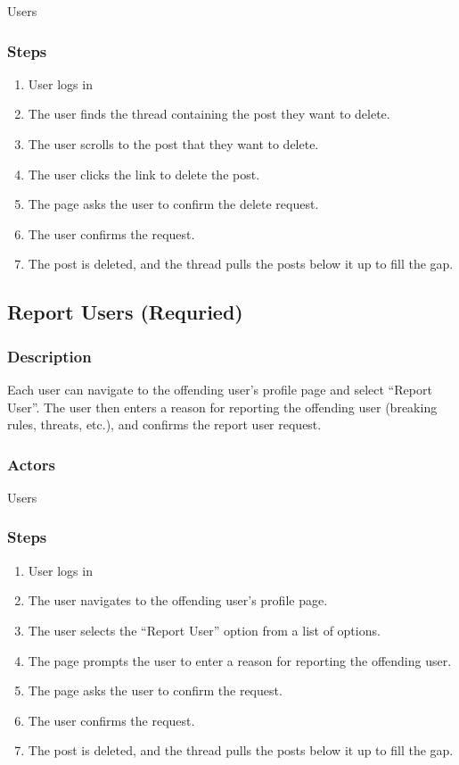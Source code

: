 \documentclass[12pt]{scrartcl}
\begin{document}
Users

\subsubsection{Steps}

\begin{enumerate}
\item User logs in
\item The user finds the thread containing the post they want to delete.
\item The user scrolls to the post that they want to delete.
\item The user clicks the link to delete the post.
\item The page asks the user to confirm the delete request.
\item The user confirms the request.
\item The post is deleted, and the thread pulls the posts below it up to fill the gap.
\end{enumerate}



\subsection{Report Users (Requried)}
\subsubsection{Description}

Each user can navigate to the offending user’s profile page and select “Report User”. The user then enters a reason for reporting the offending user (breaking rules, threats, etc.), and confirms the report user request.

\subsubsection{Actors}

Users

\subsubsection{Steps}

\begin{enumerate}
\item User logs in
\item The user navigates to the offending user’s profile page.
\item The user selects the “Report User” option from a list of options.
\item The page prompts the user to enter a reason for reporting the offending user.
\item The page asks the user to confirm the request.
\item The user confirms the request.
\item The post is deleted, and the thread pulls the posts below it up to fill the gap.
\end{enumerate}
\end{document}
